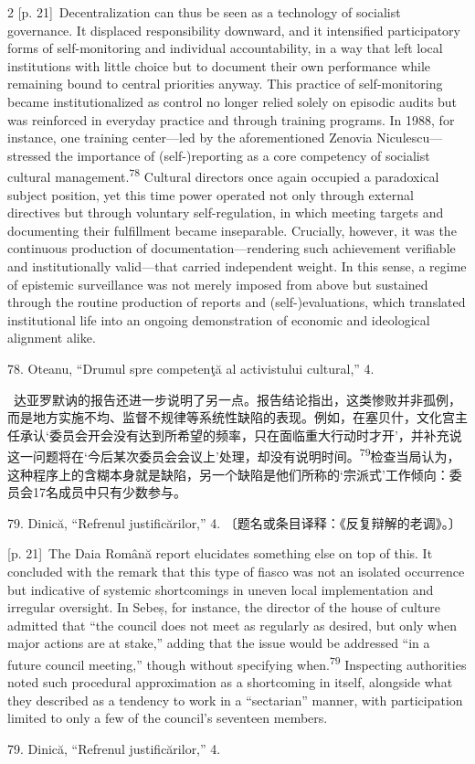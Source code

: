 \documentclass[10pt,a4paper]{article}
\begin{document}
\begin{paracol}{2}
\switchcolumn
{\scriptsize\color{gray} [p. 21]}\ Decentralization can thus be seen as a technology of socialist governance. It displaced responsibility downward, and it intensified participatory forms of self-monitoring and individual accountability, in a way that left local institutions with little choice but to document their own performance while remaining bound to central priorities anyway. This practice of self-monitoring became institutionalized as control no longer relied solely on episodic audits but was reinforced in everyday practice and through training programs. In 1988, for instance, one training center—led by the aforementioned Zenovia Niculescu—stressed the importance of (self-)reporting as a core competency of socialist cultural management.\nobreak\textsuperscript{78} Cultural directors once again occupied a paradoxical subject position, yet this time power operated not only through external directives but through voluntary self-regulation, in which meeting targets and documenting their fulfillment became inseparable. Crucially, however, it was the continuous production of documentation—rendering such achievement verifiable and institutionally valid—that carried independent weight. In this sense, a regime of epistemic surveillance was not merely imposed from above but sustained through the routine production of reports and (self-)evaluations, which translated institutional life into an ongoing demonstration of economic and ideological alignment alike.\par{\small 78. Oteanu, “Drumul spre competenţă al activistului cultural,” 4.\par}
\switchcolumn*
{\scriptsize\color{gray} [p. 21]}\ 达亚罗默讷的报告还进一步说明了另一点。报告结论指出，这类惨败并非孤例，而是地方实施不均、监督不规律等系统性缺陷的表现。例如，在塞贝什，文化宫主任承认‘委员会开会没有达到所希望的频率，只在面临重大行动时才开’，并补充说这一问题将在‘今后某次委员会会议上’处理，却没有说明时\mbox{间。\textsuperscript{79}}检查当局认为，这种程序上的含糊本身就是缺陷，另一个缺陷是他们所称的‘宗派式’工作倾向：委员会17名成员中只有少数参与。\par{\small 79. Dinică, “Refrenul justificărilor,” 4. 〔题名或条目译释：《反复辩解的老调》。〕\par}
\switchcolumn
{\scriptsize\color{gray} [p. 21]}\ The Daia Română report elucidates something else on top of this. It concluded with the remark that this type of fiasco was not an isolated occurrence but indicative of systemic shortcomings in uneven local implementation and irregular oversight. In Sebeș, for instance, the director of the house of culture admitted that “the council does not meet as regularly as desired, but only when major actions are at stake,” adding that the issue would be addressed “in a future council meeting,” though without specifying when.\nobreak\textsuperscript{79} Inspecting authorities noted such procedural approximation as a shortcoming in itself, alongside what they described as a tendency to work in a “sectarian” manner, with participation limited to only a few of the council’s seventeen members.\par{\small 79. Dinică, “Refrenul justificărilor,” 4.\par}

\end{paracol}
\end{document}
